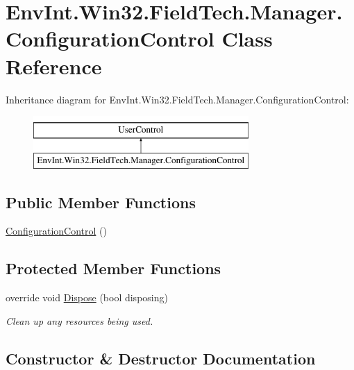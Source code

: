 \hypertarget{class_env_int_1_1_win32_1_1_field_tech_1_1_manager_1_1_configuration_control}{}\section{Env\+Int.\+Win32.\+Field\+Tech.\+Manager.\+Configuration\+Control Class Reference}
\label{class_env_int_1_1_win32_1_1_field_tech_1_1_manager_1_1_configuration_control}
Inheritance diagram for Env\+Int.\+Win32.\+Field\+Tech.\+Manager.\+Configuration\+Control\+:\begin{figure}[H]
\begin{center}
\leavevmode
\includegraphics[height=2.000000cm]{class_env_int_1_1_win32_1_1_field_tech_1_1_manager_1_1_configuration_control}
\end{center}
\end{figure}
\subsection*{Public Member Functions}
\begin{DoxyCompactItemize}
\item 
\hyperlink{class_env_int_1_1_win32_1_1_field_tech_1_1_manager_1_1_configuration_control_a5031574c103c0f889f804f5b467e4fd6}{Configuration\+Control} ()
\end{DoxyCompactItemize}
\subsection*{Protected Member Functions}
\begin{DoxyCompactItemize}
\item 
override void \hyperlink{class_env_int_1_1_win32_1_1_field_tech_1_1_manager_1_1_configuration_control_a389f012278222be54a39e3049f6434bb}{Dispose} (bool disposing)
\begin{DoxyCompactList}\small\item\em Clean up any resources being used. \end{DoxyCompactList}\end{DoxyCompactItemize}


\subsection{Constructor \& Destructor Documentation}
\hypertarget{class_env_int_1_1_win32_1_1_field_tech_1_1_manager_1_1_configuration_control_a5031574c103c0f889f804f5b467e4fd6}{}
